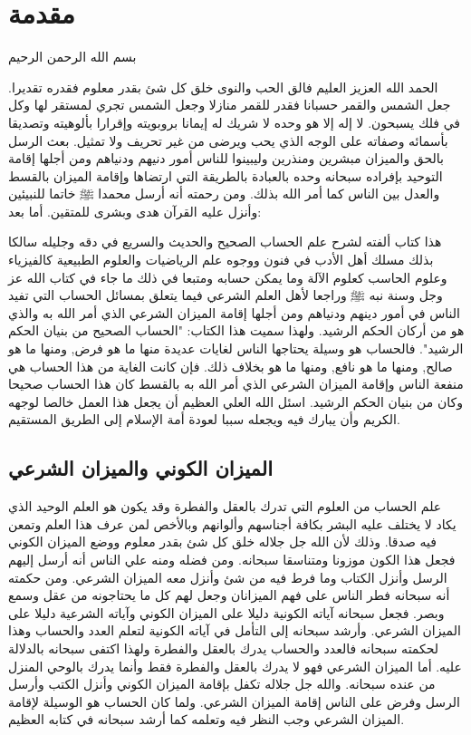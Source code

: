 
\chapter{مقدمة}

\begin{center}
  بسم الله الرحمن الرحيم
\end{center}

الحمد الله العزيز العليم فالق الحب والنوى خلق كل شئ بقدر معلوم فقدره تقديرا. جعل الشمس والقمر حسبانا فقدر للقمر منازلا وجعل الشمس تجري لمستقر لها وكل في فلك يسبحون. لا إله إلا هو وحده لا شريك له  إيمانا بروبويته وإقرارا بألوهيته وتصديقا بأسمائه وصفاته على الوجه الذي يحب ويرضى من غير تحريف ولا تمثيل. بعث الرسل بالحق والميزان مبشرين ومنذرين وليبينوا للناس أمور دنيهم ودنياهم ومن أجلها إقامة التوحيد بإفراده سبحانه وحده بالعبادة بالطريقة التي ارتضاها وإقامة الميزان بالقسط والعدل بين الناس كما أمر الله بذلك. ومن رحمته أنه أرسل محمدا ﷺ خاتما للنبيئين وأنزل عليه القرآن هدى وبشرى للمتقين. أما بعد:

هذا كتاب ألفته لشرح علم الحساب الصحيح والحديث والسريع في دقه وجليله سالكا بذلك مسلك أهل الأدب في فنون ووجوه علم الرياضيات والعلوم الطبيعية كالفيزياء وعلوم الحاسب كعلوم الآلة وما يمكن حسابه ومتبعا في ذلك ما جاء في كتاب الله عز وجل وسنة نبه ﷺ وراجعا لأهل العلم الشرعي فيما يتعلق بمسائل الحساب التي تفيد الناس في أمور دينهم ودنياهم ومن أجلها إقامة الميزان الشرعي الذي أمر الله به والذي هو من أركان الحكم الرشيد. ولهذا سميت هذا الكتاب: "الحساب الصحيح من بنيان الحكم الرشيد". فالحساب هو وسيلة يحتاجها الناس لغايات عديدة منها ما هو فرض, ومنها ما هو صالح, ومنها ما هو نافع, ومنها ما هو بخلاف ذلك. فإن كانت الغاية من هذا الحساب هي منفعة الناس وإقامة الميزان الشرعي الذي أمر الله به بالقسط كان هذا الحساب صحيحا وكان من بنيان الحكم الرشيد. اسئل الله العلي العظيم أن يجعل هذا العمل خالصا لوجهه الكريم وأن يبارك فيه ويجعله سببا لعودة أمة الإسلام إلى الطريق المستقيم.

\section{الميزان الكوني والميزان الشرعي}

علم الحساب من العلوم التي تدرك بالعقل والفطرة وقد يكون هو العلم الوحيد الذي يكاد لا يختلف عليه البشر بكافة أجناسهم وألوانهم وبالأخص لمن عرف هذا العلم وتمعن فيه صدقا. وذلك لأن الله جل جلاله خلق كل شئ بقدر معلوم ووضع الميزان الكوني فجعل هذا الكون موزونا ومتناسقا سبحانه. ومن فضله ومنه علي الناس أنه أرسل إليهم الرسل وأنزل الكتاب وما فرط فيه من شئ وأنزل معه الميزان الشرعي. ومن حكمته أنه سبحانه فطر الناس على فهم الميزانان وجعل لهم كل ما يحتاجونه من عقل وسمع وبصر. فجعل سبحانه آياته الكونية دليلا على الميزان الكوني وآياته الشرعية دليلا على الميزان الشرعي. وأرشد سبحانه إلى التأمل في آياته الكونية لتعلم العدد والحساب وهذا لحكمته سبحانه فالعدد والحساب يدرك بالعقل والفطرة ولهذا اكتفى سبحانه بالدلالة عليه. أما الميزان الشرعي فهو لا يدرك بالعقل والفطرة فقط وأنما يدرك بالوحي المنزل من عنده سبحانه. والله جل جلاله تكفل بإقامة الميزان الكوني وأنزل الكتب وأرسل الرسل وفرض على الناس إقامة الميزان الشرعي. ولما كان الحساب هو الوسيلة لإقامة الميزان الشرعي وجب النظر فيه وتعلمه كما أرشد سبحانه في كتابه العظيم.


